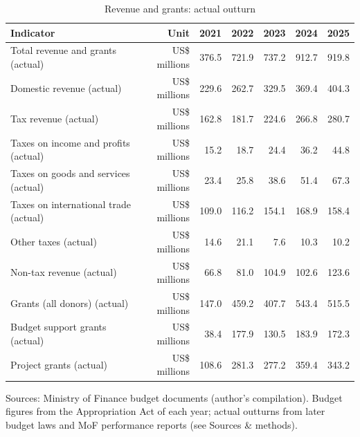 \begin{table}[htbp]\centering
\caption{Revenue and grants: actual outturn}
\begin{tabular}{lrrrrrr}
\toprule
Indicator & Unit & 2021 & 2022 & 2023 & 2024 & 2025 \\
\midrule
Total revenue and grants (actual) & US\$ millions & 376.5 & 721.9 & 737.2 & 912.7 & 919.8 \\
Domestic revenue (actual) & US\$ millions & 229.6 & 262.7 & 329.5 & 369.4 & 404.3 \\
Tax revenue (actual) & US\$ millions & 162.8 & 181.7 & 224.6 & 266.8 & 280.7 \\
Taxes on income and profits (actual) & US\$ millions & 15.2 & 18.7 & 24.4 & 36.2 & 44.8 \\
Taxes on goods and services (actual) & US\$ millions & 23.4 & 25.8 & 38.6 & 51.4 & 67.3 \\
Taxes on international trade (actual) & US\$ millions & 109.0 & 116.2 & 154.1 & 168.9 & 158.4 \\
Other taxes (actual) & US\$ millions & 14.6 & 21.1 & 7.6 & 10.3 & 10.2 \\
Non-tax revenue (actual) & US\$ millions & 66.8 & 81.0 & 104.9 & 102.6 & 123.6 \\
Grants (all donors) (actual) & US\$ millions & 147.0 & 459.2 & 407.7 & 543.4 & 515.5 \\
Budget support grants (actual) & US\$ millions & 38.4 & 177.9 & 130.5 & 183.9 & 172.3 \\
Project grants (actual) & US\$ millions & 108.6 & 281.3 & 277.2 & 359.4 & 343.2 \\
\bottomrule
\end{tabular}
\par\smallskip\footnotesize Sources: Ministry of Finance budget documents (author's compilation). Budget figures from the Appropriation Act of each year; actual outturns from later budget laws and MoF performance reports (see Sources \& methods).
\end{table}
